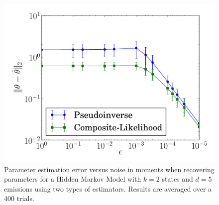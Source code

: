 %


\begin{figure}
  \centering
  \includegraphics[width=0.8\columnwidth]{figures/asymp-k2d5.pdf}
  \caption{Parameter estimation error versus noise in moments when recovering parameters for a Hidden
  Markov Model with $k=2$ states and $d=5$ emissions using two types of estimators. Results are averaged over a 400 trials.}
    \label{fig:cl-hmm}
\end{figure}
